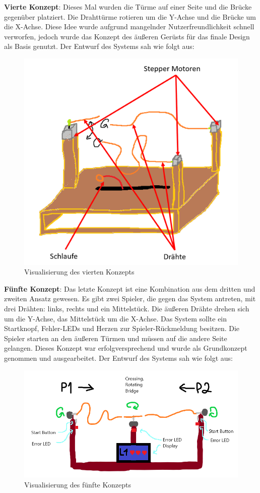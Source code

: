 \textbf{Vierte Konzept}: Dieses Mal wurden die Türme auf einer Seite und die Brücke gegenüber platziert. Die Drahttürme rotieren um die Y-Achse und die Brücke um die X-Achse. Diese Idee wurde aufgrund mangelnder Nutzerfreundlichkeit schnell verworfen, jedoch wurde das Konzept des äußeren Gerüsts für das finale Design als Basis genutzt. Der Entwurf des Systems sah wie folgt aus:

\begin{figure}[H]
 \centerline{\includegraphics[width=.6\textwidth,scale=1]{./images/Konzeptpapier_6.png}}
 \caption{Visualisierung des vierten Konzepts}\label{imageLabel}
\end{figure} 

\textbf{Fünfte Konzept}: Das letzte Konzept ist eine Kombination aus dem dritten und zweiten Ansatz gewesen. Es gibt zwei Spieler, die gegen das System antreten, mit drei Drähten: links, rechts und ein Mittelstück. Die äußeren Drähte drehen sich um die Y-Achse, das Mittelstück um die X-Achse. Das System sollte ein Startknopf, Fehler-LEDs und Herzen zur Spieler-Rückmeldung besitzen. Die Spieler starten an den äußeren Türmen und müssen auf die andere Seite gelangen. Dieses Konzept war erfolgversprechend und wurde als Grundkonzept genommen und ausgearbeitet. Der Entwurf des Systems sah wie folgt aus:

\begin{figure}[H]
 \centerline{\includegraphics[width=\textwidth,scale=1]{./images/Konzeptpapier_5.png}}
 \caption{Visualisierung des fünfte Konzepts}\label{imageLabel}
\end{figure} 

